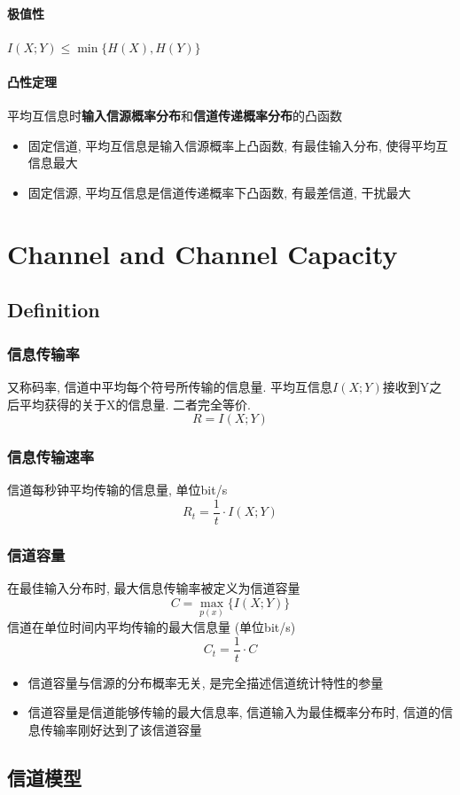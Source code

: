 \documentclass[a4paper]{report}
\begin{document}
\paragraph{极值性} $I(X;Y)\leq \min\{H(X),H(Y)\}$
\paragraph{凸性定理}平均互信息时\textbf{输入信源概率分布}和\textbf{信道传递概率分布}的凸函数
\begin{itemize}
  \item 固定信道, 平均互信息是输入信源概率上凸函数, 有最佳输入分布, 使得平均互信息最大
  \item 固定信源, 平均互信息是信道传递概率下凸函数, 有最差信道, 干扰最大
\end{itemize}

\section{Channel and Channel Capacity}
\subsection{Definition}
\subsubsection{信息传输率}
又称码率, 信道中平均每个符号所传输的信息量. 
平均互信息$I(X;Y)$接收到Y之后平均获得的关于X的信息量. 
二者完全等价. 
$$R=I(X;Y)$$
\subsubsection{信息传输速率}
信道每秒钟平均传输的信息量, 单位bit/s
$$R_t=\frac{1}{t}\cdot I(X;Y)$$
\subsubsection{信道容量}
在最佳输入分布时, 最大信息传输率被定义为信道容量
$$C=\underset{p(x)}{\max} \{I(X;Y)\}$$
信道在单位时间内平均传输的最大信息量 (单位bit/s)
$$C_t=\frac{1}{t}\cdot C$$

\begin{itemize}
  \item 信道容量与信源的分布概率无关, 是完全描述信道统计特性的参量
  \item 信道容量是信道能够传输的最大信息率, 信道输入为最佳概率分布时, 信道的信息传输率刚好达到了该信道容量
\end{itemize}
\subsection{信道模型}
\end{document}
